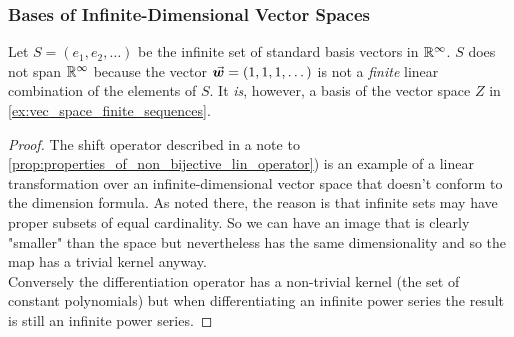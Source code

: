 \documentclass[MathsNotesBase.tex]{subfiles}
\begin{document}
{	\bigskip
	\subsubsection{Bases of Infinite-Dimensional Vector Spaces}
	
	\bigskip
	\begin{exe}
		\item{Let ${ S = (e_1,e_2,\dots) }$ be the infinite set of standard basis vectors in $\mathbb{R}^{\infty}$. $S$ does not span $\mathbb{R}^{\infty}$ because the vector ${ \vec{\bm{w}} = (1,1,1,\dots) }$ is not a \textit{finite} linear combination of the elements of $S$. It \textit{is}, however, a basis of the vector space $Z$ in \ref{ex:vec_space_finite_sequences}.
		}
	\end{exe}

	
	\begin{proof}
		The shift operator described in a note to \autoref{prop:properties_of_non_bijective_lin_operator}) is an example of a linear transformation over an infinite-dimensional vector space that doesn't conform to the dimension formula. As noted there, the reason is that infinite sets may have proper subsets of equal cardinality. So we can have an image that is clearly "smaller" than the space but nevertheless has the same dimensionality and so the map has a trivial kernel anyway.\\
		Conversely the differentiation operator has a non-trivial kernel (the set of constant polynomials) but when differentiating an infinite power series the result is still an infinite power series.
	\end{proof}

	\bigskip{}
}
\end{document}
